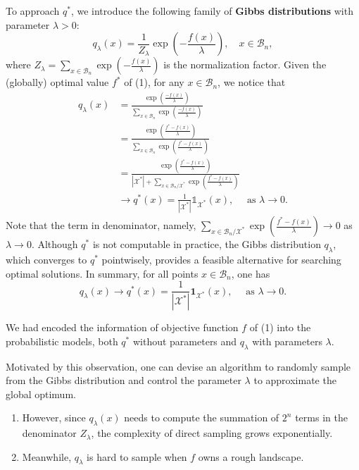 To approach $q^{*}$, we introduce the following family of \textbf{Gibbs distributions} with parameter $\lambda > 0$:
\begin{equation}
    q_{\lambda}(x)=\frac{1}{Z_{\lambda}} \exp \left(-\frac{f(x)}{\lambda}\right), \quad x \in \mathcal{B}_{n}, \tag{3}
\end{equation}
where $Z_{\lambda}=\sum_{x \in \mathcal{B}_{n}} \exp \left(-\frac{f(x)}{\lambda}\right)$ is the normalization factor. Given the (globally) optimal value $f^{*}$ of (1), for any $x \in \mathcal{B}_{n}$, we notice that
\begin{align}
q_{\lambda}(x) & =\frac{\exp \left(\frac{-f(x)}{\lambda}\right)}{\sum_{x \in \mathcal{B}_{n}} \exp \left(\frac{-f(x)}{\lambda}\right)} \\
& =\frac{\exp \left(\frac{f^{*}-f(x)}{\lambda}\right)}{\sum_{x \in \mathcal{B}_{n}} \exp \left(\frac{f^{*}-f(x)}{\lambda}\right)} \\
&=\frac{\exp \left(\frac{f^{*}-f(x)}{\lambda}\right)}{\left|\mathcal{X}^{*}\right|+\sum_{x \in \mathcal{B}_{n} / \mathcal{X}^{*}} \exp \left(\frac{f^{*}-f(x)}{\lambda}\right)}  \tag{4}\\
& \rightarrow q^{*}(x)=\frac{1}{\left|\mathcal{X}^{*}\right|} \mathbb{1}_{\mathcal{X}^{*}}(x), \quad \text { as } \lambda \rightarrow 0.
\end{align}
Note that the term in denominator, namely, $\sum_{x \in \mathcal{B}_n / \mathcal{X}^*} \exp \left(\frac{f^*-f(x)}{\lambda}\right) \to 0$ as $\lambda \to 0$. Although $q^{*}$ is not computable in practice, the Gibbs distribution $q_{\lambda}$, which converges to $q^{*}$ pointwisely, provides a feasible alternative for searching optimal solutions. In summary, for all points $x \in\mathcal{B}_n$, 
one has
\begin{equation}
    q_\lambda(x) \to q^*(x)=\frac{1}{\left|\mathcal{X}^*\right|} \mathbf{1}_{\mathcal{X}^*}(x), \quad \text { as } \lambda \rightarrow 0.
\end{equation}
\begin{remark}
    We had encoded the information of objective function $f$ of (1) into the probabilistic models, both $q^{*}$ without parameters and $q_\lambda$ with parameters $\lambda$.
\end{remark}

Motivated by this observation, one can devise an algorithm to randomly sample from the Gibbs distribution and control the parameter $\lambda$ to approximate the global optimum. 
\begin{enumerate}
    \item However, since $q_{\lambda}(x)$ needs to compute the summation of $2^{n}$ terms in the denominator $Z_{\lambda}$, the complexity of direct sampling grows exponentially.
    \item Meanwhile, $q_{\lambda}$ is hard to sample when $f$ owns a rough landscape.
\end{enumerate}

